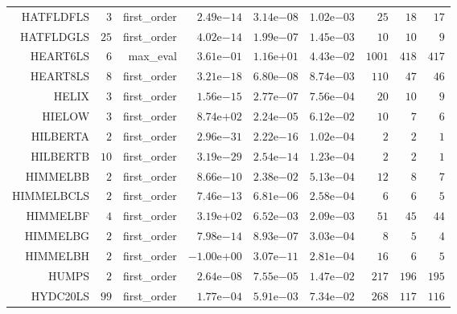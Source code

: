 \begin{longtable}{rrrrrrrrr}
HATFLDFLS & \(     3\) & first\_order & \( 2.49\)e\(-14\) & \( 3.14\)e\(-08\) & \( 1.02\)e\(-03\) & \(    25\) & \(    18\) & \(    17\) \\
HATFLDGLS & \(    25\) & first\_order & \( 4.02\)e\(-14\) & \( 1.99\)e\(-07\) & \( 1.45\)e\(-03\) & \(    10\) & \(    10\) & \(     9\) \\
HEART6LS & \(     6\) & max\_eval & \( 3.61\)e\(-01\) & \( 1.16\)e\(+01\) & \( 4.43\)e\(-02\) & \(  1001\) & \(   418\) & \(   417\) \\
HEART8LS & \(     8\) & first\_order & \( 3.21\)e\(-18\) & \( 6.80\)e\(-08\) & \( 8.74\)e\(-03\) & \(   110\) & \(    47\) & \(    46\) \\
HELIX & \(     3\) & first\_order & \( 1.56\)e\(-15\) & \( 2.77\)e\(-07\) & \( 7.56\)e\(-04\) & \(    20\) & \(    10\) & \(     9\) \\
HIELOW & \(     3\) & first\_order & \( 8.74\)e\(+02\) & \( 2.24\)e\(-05\) & \( 6.12\)e\(-02\) & \(    10\) & \(     7\) & \(     6\) \\
HILBERTA & \(     2\) & first\_order & \( 2.96\)e\(-31\) & \( 2.22\)e\(-16\) & \( 1.02\)e\(-04\) & \(     2\) & \(     2\) & \(     1\) \\
HILBERTB & \(    10\) & first\_order & \( 3.19\)e\(-29\) & \( 2.54\)e\(-14\) & \( 1.23\)e\(-04\) & \(     2\) & \(     2\) & \(     1\) \\
HIMMELBB & \(     2\) & first\_order & \( 8.66\)e\(-10\) & \( 2.38\)e\(-02\) & \( 5.13\)e\(-04\) & \(    12\) & \(     8\) & \(     7\) \\
HIMMELBCLS & \(     2\) & first\_order & \( 7.46\)e\(-13\) & \( 6.81\)e\(-06\) & \( 2.58\)e\(-04\) & \(     6\) & \(     6\) & \(     5\) \\
HIMMELBF & \(     4\) & first\_order & \( 3.19\)e\(+02\) & \( 6.52\)e\(-03\) & \( 2.09\)e\(-03\) & \(    51\) & \(    45\) & \(    44\) \\
HIMMELBG & \(     2\) & first\_order & \( 7.98\)e\(-14\) & \( 8.93\)e\(-07\) & \( 3.03\)e\(-04\) & \(     8\) & \(     5\) & \(     4\) \\
HIMMELBH & \(     2\) & first\_order & \(-1.00\)e\(+00\) & \( 3.07\)e\(-11\) & \( 2.81\)e\(-04\) & \(    16\) & \(     6\) & \(     5\) \\
HUMPS & \(     2\) & first\_order & \( 2.64\)e\(-08\) & \( 7.55\)e\(-05\) & \( 1.47\)e\(-02\) & \(   217\) & \(   196\) & \(   195\) \\
HYDC20LS & \(    99\) & first\_order & \( 1.77\)e\(-04\) & \( 5.91\)e\(-03\) & \( 7.34\)e\(-02\) & \(   268\) & \(   117\) & \(   116\) \\

\end{longtable}
